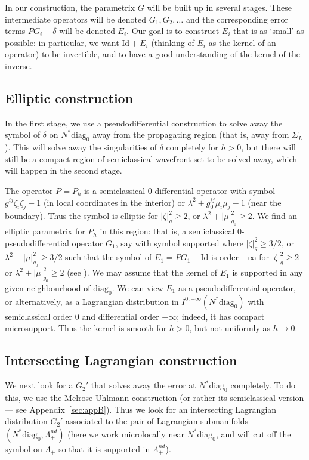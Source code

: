 \documentclass[10pt, a4paper, twoside]{amsart}
\numberwithin{equation}{section}
\theoremstyle{remark}
\begin{document}
In our construction, the parametrix $G$ will be built up in several stages. These intermediate operators will be denoted $G_1, G_2, \dots$ and the corresponding error terms $P G_i - \delta$ will be denoted $E_i$. Our goal is to construct $E_i$ that is as `small' as possible: in particular, we want ${\mathrm{Id}} + E_i$ (thinking of $E_i$ as the kernel of an operator) to be invertible, and to have a good understanding of the kernel of the inverse. 

\subsection{Elliptic construction}

In the first stage, we use a pseudodifferential construction to solve away the symbol of $\delta$ on $N^* {\mathrm{diag}_0}$ away from the propagating region (that is, away from $\Sigma_L$). This will solve away the singularities of $\delta$ completely for $h > 0$, but there will still be a compact region of semiclassical wavefront set to be solved away, which will happen in the second stage. 

The operator $P = P_h$ is a semiclassical 0-differential operator with symbol $g^{ij} \zeta_i \zeta_j - 1$ (in local coordinates in the interior) or $\lambda^2 + g_0^{ij} \mu_i \mu_j - 1$ (near the boundary). Thus the symbol is elliptic for $|\zeta|^2_g \geq 2$, or $\lambda^2 + |\mu|_{g_0}^2 \geq 2$. We find an elliptic parametrix for $P_h$ in this region: that is, a semiclassical 0-pseudodifferential operator $G_1$, say with symbol supported where $|\zeta|^2_g \geq 3/2$, or $\lambda^2 + |\mu|_{g_0}^2 \geq 3/2$ such that the symbol of $E_1 = P G_1 - {\mathrm{Id}}$ is order $-\infty$ for $|\zeta|^2_g \geq 2$ or $\lambda^2 + |\mu|_{g_0}^2 \geq 2$ (see \cite[Section 4.7]{zworski}). We may assume that the kernel of $E_1$ is supported in any given neighbourhood of ${\mathrm{diag}_0}$. We can view $E_1$ as a pseudodifferential operator, or alternatively, as a Lagrangian distribution in $I^{0, -\infty}(N^* {\mathrm{diag}_0})$ with semiclassical order $0$ and differential order $-\infty$; indeed, it has compact microsupport. Thus the kernel is smooth for $h > 0$, but not uniformly as $h \to 0$. 

\subsection{Intersecting Lagrangian construction}

We next look for a $G_2'$ that solves away the error at $N^* {\mathrm{diag}_0}$ completely. To do this, we use the Melrose-Uhlmann construction (or rather its semiclassical version --- see Appendix~\ref{sec:appB}). Thus we look for an intersecting Lagrangian distribution $G_2'$ associated to the pair of Lagrangian submanifolds $(N^* {\mathrm{diag}_0}, \Lambda_+^{nd})$ (here we work microlocally near $N^* {\mathrm{diag}_0}$, and will cut off the symbol on $\Lambda_+$ so that it is supported in $\Lambda_+^{nd}$). 
\end{document}
